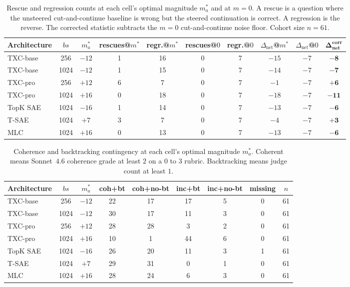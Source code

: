 \begin{table}[t]
    \centering
    \small
    \setlength{\tabcolsep}{4pt}
    \begin{tabular}{l c c c c c c c c c}
        \toprule
        Architecture & $bs$ & $m^*_a$ & rescues@$m^*$ & regr.@$m^*$ & rescues@$0$ & regr.@$0$ & $\Delta_{\text{net}}$@$m^*$ & $\Delta_{\text{net}}$@$0$ & $\boldsymbol{\Delta_{\text{net}}^{\text{corr}}}$ \\
        \midrule
        TXC-base & 256 & $-12$ & 1 & 16 & 0 & 7 & $-15$ & $-7$ & $\mathbf{-8}$ \\
        TXC-base & 1024 & $-12$ & 1 & 15 & 0 & 7 & $-14$ & $-7$ & $\mathbf{-7}$ \\
        TXC-pro & 256 & $+12$ & 6 & 7 & 0 & 7 & $-1$ & $-7$ & $\mathbf{+6}$ \\
        TXC-pro & 1024 & $+16$ & 0 & 18 & 0 & 7 & $-18$ & $-7$ & $\mathbf{-11}$ \\
        TopK SAE & 1024 & $-16$ & 1 & 14 & 0 & 7 & $-13$ & $-7$ & $\mathbf{-6}$ \\
        T-SAE & 1024 & $+7$ & 3 & 7 & 0 & 7 & $-4$ & $-7$ & $\mathbf{+3}$ \\
        MLC & 1024 & $+16$ & 0 & 13 & 0 & 7 & $-13$ & $-7$ & $\mathbf{-6}$ \\
        \bottomrule
    \end{tabular}
    \caption{Rescue and regression counts at each cell's optimal magnitude $m^*_a$ and at $m=0$. A rescue is a question where the unsteered cut-and-continue baseline is wrong but the steered continuation is correct. A regression is the reverse. The corrected statistic subtracts the $m=0$ cut-and-continue noise floor. Cohort size $n=61$.}
    \label{tab:c7-net-saves}
\end{table}

\begin{table}[t]
    \centering
    \small
    \setlength{\tabcolsep}{4pt}
    \begin{tabular}{l c c c c c c c c}
        \toprule
        Architecture & $bs$ & $m^*_a$ & coh+bt & coh+no-bt & inc+bt & inc+no-bt & missing & $n$ \\
        \midrule
        TXC-base & 256 & $-12$ & 22 & 17 & 17 & 5 & 0 & 61 \\
        TXC-base & 1024 & $-12$ & 30 & 17 & 11 & 3 & 0 & 61 \\
        TXC-pro & 256 & $+12$ & 28 & 28 & 3 & 2 & 0 & 61 \\
        TXC-pro & 1024 & $+16$ & 10 & 1 & 44 & 6 & 0 & 61 \\
        TopK SAE & 1024 & $-16$ & 26 & 20 & 11 & 3 & 1 & 61 \\
        T-SAE & 1024 & $+7$ & 29 & 31 & 0 & 1 & 0 & 61 \\
        MLC & 1024 & $+16$ & 28 & 24 & 6 & 3 & 0 & 61 \\
        \bottomrule
    \end{tabular}
    \caption{Coherence and backtracking contingency at each cell's optimal magnitude $m^*_a$. Coherent means Sonnet~$4.6$ coherence grade at least $2$ on a $0$ to $3$ rubric. Backtracking means judge count at least $1$.}
    \label{tab:c7-contingency}
\end{table}

